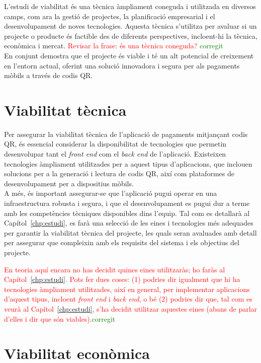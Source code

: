 \documentclass[a4paper,12pt,twoside]{ThesisStyle}
\newcommand{\pau}[1]{\textcolor{red}{#1}}
\newcommand{\sudan}[1]{\textcolor{green}{#1}}
\begin{document}
L'estudi de viabilitat és una tècnica àmpliament coneguda i utilitzada en diversos camps, com ara la gestió de projectes, la planificació empresarial i el desenvolupament de noves tecnologies. Aquesta tècnica s'utilitza per avaluar si un projecte o producte és factible des de diferents perspectives, incloent-hi la tècnica, econòmica i mercat. 
\pau{Revisar la frase: és una tècnica coneguda?} \sudan{corregit}\\ 

En conjunt demostra que el projecte és viable i té un alt potencial de creixement en l'entorn actual, oferint una solució innovadora i segura per als pagaments mòbils a través de codis QR.

\section{Viabilitat tècnica}
\label{subsec:Viabilitat tècnica}

Per assegurar la viabilitat tècnica de l'aplicació de pagaments mitjançant codis QR, és essencial considerar la disponibilitat de tecnologies que permetin desenvolupar tant el \textit{front end} com el \textit{back end} de l'aplicació. Existeixen tecnologies àmpliament utilitzades per a aquest tipus d'aplicacions, que inclouen solucions per a la generació i lectura de codis QR, així com plataformes de desenvolupament per a dispositius mòbils.\\

A més, és important assegurar-se que l'aplicació pugui operar en una infraestructura robusta i segura, i que el desenvolupament es pugui dur a terme amb les competències tècniques disponibles dins l'equip. Tal com es detallarà al Capítol~\ref{chp:estudi}, es farà una selecció de les eines i tecnologies més adequades per garantir la viabilitat tècnica del projecte, les quals seran avaluades amb detall per assegurar que compleixin amb els requisits del sistema i els objectius del projecte.

\pau{En teoria aquí encara no has decidit quines eines utilitzaràs; ho faràs al Capítol~\ref{chp:estudi}. Pots fer dues coses: (1) podries dir igualment que hi ha tecnologies àmpliament utilitzades, així en general, per implementar aplicacions d'aquest tipus, incloent \textit{front end} i \textit{back end}, o bé (2) podries dir que, tal com es veurà al Capítol~\ref{chp:estudi}, s'ha decidit utilitzar aquestes eines (abans de parlar d'elles i dir que són viables).}\sudan{corregit}

\section{Viabilitat econòmica}
\label{subsec:Viabilitat económica}
\end{document}
